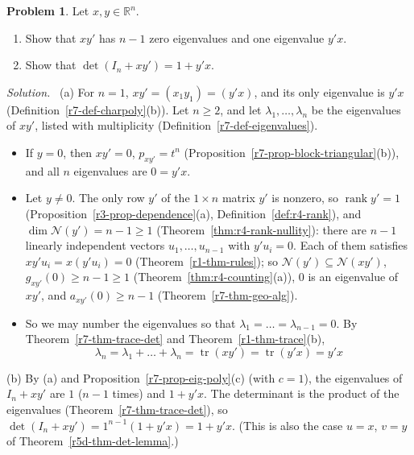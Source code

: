 \documentclass[12pt]{article}
\newcommand{\R}{\mathbb R}
\DeclareMathOperator{\tr}{tr}
\DeclareMathOperator{\rank}{rank}
\theoremstyle{definition}
\newtheorem{problem}{Problem}
\newenvironment{solution}{\par\noindent\textit{Solution.}\ }{\par\smallskip}
\begin{document}
\begin{problem}\label{r7-pr-rank-one}
Let \(x,y\in\R^n\).
\begin{enumerate}
\item Show that \(xy'\) has \(n-1\) zero eigenvalues and one eigenvalue \(y'x\).
\item Show that \(\det(I_n+xy')=1+y'x\).
\end{enumerate}
\end{problem}
\begin{solution}
(a) For \(n=1\), \(xy'=(x_1y_1)=(y'x)\), and its only eigenvalue is \(y'x\) (Definition~\ref{r7-def-charpoly}(b)). Let
\(n\geqslant2\), and let \(\lambda_1,\dots,\lambda_n\) be the eigenvalues of \(xy'\), listed with multiplicity
(Definition~\ref{r7-def-eigenvalues}).
\begin{itemize}
\item If \(y=0\), then \(xy'=0\), \(p_{xy'}=t^n\) (Proposition~\ref{r7-prop-block-triangular}(b)), and all \(n\) eigenvalues
are \(0=y'x\).
\item Let \(y\ne0\). The only row \(y'\) of the \(1\times n\) matrix \(y'\) is nonzero, so \(\rank y'=1\)
(Proposition~\ref{r3-prop-dependence}(a), Definition~\ref{def:r4-rank}), and \(\dim\mathcal N(y')=n-1\geqslant1\)
(Theorem~\ref{thm:r4-rank-nullity}): there are \(n-1\) linearly independent vectors \(u_1,\dots,u_{n-1}\) with
\(y'u_i=0\). Each of them satisfies \(xy'u_i=x(y'u_i)=0\) (Theorem~\ref{r1-thm-rules}); so
\(\mathcal N(y')\subseteq\mathcal N(xy')\), \(g_{xy'}(0)\geqslant n-1\geqslant1\) (Theorem~\ref{thm:r4-counting}(a)),
\(0\) is an eigenvalue of \(xy'\), and \(a_{xy'}(0)\geqslant n-1\) (Theorem~\ref{r7-thm-geo-alg}).
\item So we may number the eigenvalues so that \(\lambda_1=\dots=\lambda_{n-1}=0\). By Theorem~\ref{r7-thm-trace-det}
and Theorem~\ref{r1-thm-trace}(b),
\[
\lambda_n=\lambda_1+\dots+\lambda_n=\tr(xy')=\tr(y'x)=y'x
\]
\end{itemize}
(b) By (a) and Proposition~\ref{r7-prop-eig-poly}(c) (with \(c=1\)), the eigenvalues of \(I_n+xy'\) are \(1\)
(\(n-1\) times) and \(1+y'x\). The determinant is the product of the eigenvalues (Theorem~\ref{r7-thm-trace-det}), so
\(\det(I_n+xy')=1^{n-1}(1+y'x)=1+y'x\). (This is also the case \(u=x\), \(v=y\) of Theorem~\ref{r5d-thm-det-lemma}.)
\end{solution}
\end{document}
